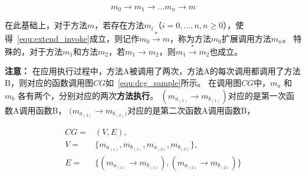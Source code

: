 \begin{equation}
m_0 \to m_1 \to \dots m_n \to m  \label{equ:extend_invoke}
\end{equation}

    在此基础上，对于方法$m$，若存在方法$m_i$（$i=0,\dots,n , n \geqslant 0$），使得~\autoref{equ:extend_invoke}成立，则记作$m_0 \stackrel{\ast}{\to} m$，称为方法$m_0$扩展调用方法$m_n$。
    特殊的，对于方法$m_1$和方法$m_2$，若$m_1 \to m_2$，则$m_1  \stackrel{\ast}{\to}  m_2$也成立。





\textbf{注意：}
在应用执行过程中，方法A被调用了两次，方法A的每次调用都调用了方法B，则对应的函数调用图$CG$如~\autoref{equ:dcg_sample}所示。
在调用图$CG$中，$m_a$ 和 $m_b$ 各有两个，分别对应的两次\textbf{方法执行}。
$(m_{a_{(1)}} \to m_{b_{(1)}})$对应的是第一次函数A调用函数B，
$(m_{a_{(2)}} \to m_{b_{(2)})}$对应的是第二次函数A调用函数B，

\begin{equation}
\begin{aligned}
CG = &(V,E) ,\\ 
V = & \{m_{a_{(1)}},m_{b_{(1)}},m_{a_{(2)}},m_{b_{(2)}}\}, \\ 
E = & \{  
    (  m_{a_{(1)}} \to m_{b_{(1)}}) ,( m_{a_{(2)}} \to m_{b_{(2)}})
 \} 
\end{aligned}
\label{equ:dcg_sample} 
\end{equation}


